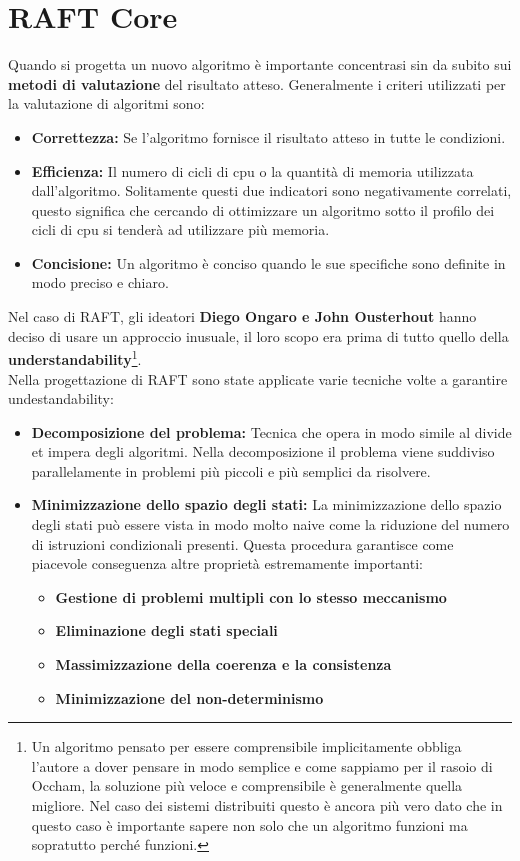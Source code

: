 	\section{RAFT Core}
    Quando si progetta un nuovo algoritmo è importante concentrasi sin da subito sui \textbf{metodi di valutazione} del risultato atteso. Generalmente i criteri utilizzati per la valutazione di algoritmi sono: 
    \begin{itemize}
      \item{\textbf{Correttezza:}}
      Se l'algoritmo fornisce il risultato atteso in tutte le condizioni.
      \item{\textbf{Efficienza:}}
      Il numero di cicli di cpu o la quantità di memoria utilizzata dall'algoritmo. Solitamente questi due indicatori sono negativamente correlati, questo significa che cercando di ottimizzare un algoritmo sotto il profilo dei cicli di cpu si tenderà ad utilizzare più memoria.
      \item{\textbf{Concisione:}}
      Un algoritmo è conciso quando le sue specifiche sono definite in modo preciso e chiaro.
    \end{itemize}
    Nel caso di RAFT, gli ideatori \textbf{Diego Ongaro e John Ousterhout} hanno deciso di usare un approccio inusuale, il loro scopo era prima di tutto quello della \textbf{understandability}\footnote{Un algoritmo pensato per essere comprensibile implicitamente obbliga l'autore a dover pensare in modo semplice e come sappiamo per il rasoio di Occham, la soluzione più veloce e comprensibile è generalmente quella migliore. Nel caso dei sistemi distribuiti questo è ancora più vero dato che in questo caso è importante sapere non solo che un algoritmo funzioni ma sopratutto perché funzioni.}.\\
    Nella progettazione di RAFT sono state applicate varie tecniche volte a garantire undestandability:
    \begin{itemize}
      \item{\textbf{Decomposizione del problema:}}
      Tecnica che opera in modo simile al divide et impera degli algoritmi. Nella decomposizione il problema viene suddiviso parallelamente in problemi più piccoli e più semplici da risolvere.
      \item{\textbf{Minimizzazione dello spazio degli stati:}}
      La minimizzazione dello spazio degli stati può essere vista in modo molto naive come la riduzione del numero di istruzioni condizionali presenti. Questa procedura garantisce come piacevole conseguenza altre proprietà estremamente importanti:
      \begin{itemize}
        \item{\textbf{Gestione di problemi multipli con lo stesso meccanismo}}
        \item{\textbf{Eliminazione degli stati speciali}}
        \item{\textbf{Massimizzazione della coerenza e la consistenza}}
        \item{\textbf{Minimizzazione del non-determinismo}}
      \end{itemize}
    \end{itemize}
